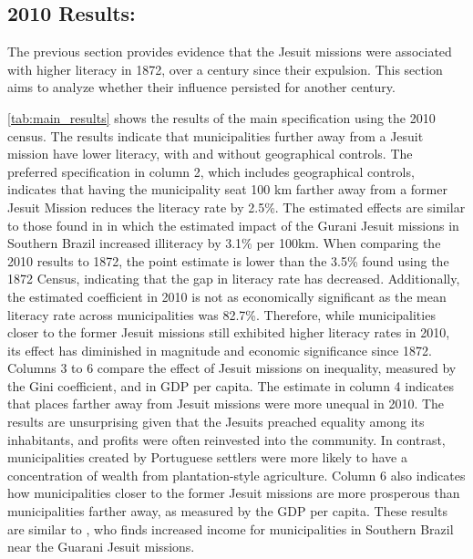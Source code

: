 \documentclass{article}
\begin{document}

\subsection{2010 Results:}

The previous section provides evidence that the Jesuit missions were associated with higher literacy in 1872, over a century since their expulsion. 
This section aims to analyze whether their influence persisted for another century.

\autoref{tab:main_results} shows the results of the main specification using the 2010 census. 
The results indicate that municipalities further away from a Jesuit mission have lower literacy, with and without geographical controls.
The preferred specification in column 2, which includes geographical controls, indicates that having the municipality seat 100 km farther away from a former Jesuit Mission reduces the literacy rate by 2.5\%.
The estimated effects are similar to those found in \textcite{Valencia_Caicedo2018-gp} in which the estimated impact of the Gurani Jesuit missions in Southern Brazil increased illiteracy by 3.1\% per 100km. 
When comparing the 2010 results to 1872, the point estimate is lower than the 3.5\% found using the 1872 Census, indicating that the gap in literacy rate has decreased. 
Additionally, the estimated coefficient in 2010 is not as economically significant as the mean literacy rate across municipalities was 82.7\%. 
Therefore, while municipalities closer to the former Jesuit missions still exhibited higher literacy rates in 2010, its effect has diminished in magnitude and economic significance since 1872. 
Columns 3 to 6 compare the effect of Jesuit missions on inequality, measured by the Gini coefficient, and in GDP per capita. 
The estimate in column 4 indicates that places farther away from Jesuit missions were more unequal in 2010. 
The results are unsurprising given that the Jesuits preached equality among its inhabitants, and profits were often reinvested into the community. 
In contrast, municipalities created by Portuguese settlers were more likely to have a concentration of wealth from plantation-style agriculture. Column 6 also indicates how municipalities closer to the former Jesuit missions are more prosperous than municipalities farther away, as measured by the GDP per capita. 
These results are similar to \textcite{Valencia_Caicedo2018-gp}, who finds increased income for municipalities in Southern Brazil near the Guarani Jesuit missions. 
\end{document}
